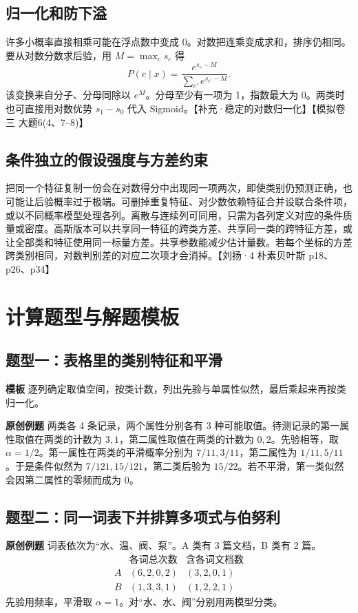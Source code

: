 \documentclass[UTF8,a4paper,zihao=-4,fontset=fandol]{ctexrep}
\begin{document}
\subsection*{归一化和防下溢}
许多小概率直接相乘可能在浮点数中变成 0。对数把连乘变成求和，排序仍相同。要从对数分数求后验，用 $M=\max_c s_c$ 得
\[
 P(c\mid x)
 =\frac{e^{s_c-M}}{\sum_{c'}e^{s_{c'}-M}}.
\]
该变换来自分子、分母同除以 $e^M$。分母至少有一项为 1，指数最大为 0。两类时也可直接用对数优势 $s_1-s_0$ 代入 Sigmoid。【补充·稳定的对数归一化】【模拟卷三 大题6(4、7–8)】

\subsection*{条件独立的假设强度与方差约束}
把同一个特征复制一份会在对数得分中出现同一项两次，即使类别仍预测正确，也可能让后验概率过于极端。可删掉重复特征、对少数依赖特征合并设联合条件项，或以不同概率模型处理各列。离散与连续列可同用，只需为各列定义对应的条件质量或密度。高斯版本可以共享同一特征的跨类方差、共享同一类的跨特征方差，或让全部类和特征使用同一标量方差。共享参数能减少估计量数。若每个坐标的方差跨类别相同，对数判别差的对应二次项才会消掉。【刘扬·4 朴素贝叶斯 p18、p26、p34】

\section{计算题型与解题模板}
\subsection*{题型一：表格里的类别特征和平滑}
\textbf{模板} 逐列确定取值空间，按类计数，列出先验与单属性似然，最后乘起来再按类归一化。

\textbf{原创例题} 两类各 4 条记录，两个属性分别各有 3 种可能取值。待测记录的第一属性取值在两类的计数为 $3,1$，第二属性取值在两类的计数为 $0,2$。先验相等，取 $\alpha=1/2$。第一属性在两类的平滑概率分别为 $7/11,3/11$，第二属性为 $1/11,5/11$。于是条件似然为 $7/121,15/121$，第二类后验为 $15/22$。若不平滑，第一类似然会因第二属性的零频而成为 0。

\subsection*{题型二：同一词表下并排算多项式与伯努利}
\textbf{原创例题} 词表依次为“水、温、阀、泵”。A 类有 3 篇文档，B 类有 2 篇。
\[
\begin{array}{c|cc}
 &\text{各词总次数}&\text{含各词文档数}\\\hline
 A&(6,2,0,2)&(3,2,0,1)\\
 B&(1,3,3,1)&(1,2,2,1)
\end{array}
\]
先验用频率，平滑取 $\alpha=1$。对“水、水、阀”分别用两模型分类。
\end{document}
